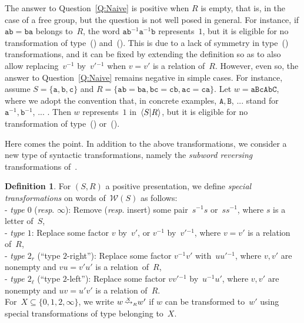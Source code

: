 \documentclass{amsart}
\numberwithin{equation}{section}
\theoremstyle{plain}
\theoremstyle{definition}
\newtheorem{defi}[prop]{Definition}
\newcounter{ITEM}
\begin{document}
The answer to Question~\ref{Q:Naive} is positive when ${R}$ is empty, that is, in the case of a free group, but the question is not well posed in general. For instance, if ${\mathtt{a}} {\mathtt{b}} = {\mathtt{b}} {\mathtt{a}}$ belongs to~${R}$, the word ${\mathtt{a}} {\mathtt{b}}{^{-1}} {\mathtt{a}}{^{-1}} {\mathtt{b}}$ represents~$1$, but it is eligible for no transformation of type~{\setcounter{ITEM}{1}\leavevmode\hbox{\rm()}} and~{\setcounter{ITEM}{2}\leavevmode\hbox{\rm()}}. This is due to a lack of symmetry in type~{\setcounter{ITEM}{2}\leavevmode\hbox{\rm()}} transformations, and it can be fixed by extending the definition so as to also allow replacing~${v}{^{-1}} $ by~${v}'{}{^{-1}} $ when ${v} = {v}'$ is a relation of~${R}$. However, even so, the answer to Question~\ref{Q:Naive} remains negative in simple cases. For instance, assume ${S} = \{{\mathtt{a}}, {\mathtt{b}}, {\mathtt{c}}\}$ and ${R} = \{{\mathtt{a}} {\mathtt{b}} = {\mathtt{b}} {\mathtt{a}}, {\mathtt{b}} {\mathtt{c}} = {\mathtt{c}} {\mathtt{b}}, {\mathtt{a}} {\mathtt{c}} = {\mathtt{c}} {\mathtt{a}}\}$. Let ${w} = {\mathtt{a}} {\mathtt{B}} {\mathtt{c}} {\mathtt{A}} {\mathtt{b}} {\mathtt{C}}$, where we adopt the convention that, in concrete examples, ${\mathtt{A}}, {\mathtt{B}}$, ... stand for~${\mathtt{a}}{^{-1}}, {\mathtt{b}}{^{-1}}$, ... \cite{Eps}. Then ${w}$ represents~$1$ in~${\langle{S}{\mid}\nobreak{R}\rangle}$, 
but it is eligible for no transformation of type~{\setcounter{ITEM}{1}\leavevmode\hbox{\rm()}} or~{\setcounter{ITEM}{2}\leavevmode\hbox{\rm()}}.

Here comes the point. In addition to the above transformations, we consider a new type of syntactic transformations, namely the \emph{subword reversing} transformations of~\cite{Dgp, Dia}.

\begin{defi}
\label{D:Special}
For $({S}, {R})$ a positive presentation, we define \emph{special transformations} on words of~${\mathcal{W}({S})}$ as follows:\\
- \emph{type $0$} ({{\it resp}}. $\infty$): Remove ({{\it resp}}. insert) some pair~${s}{^{-1}} {s}$ or~${s} {s}{^{-1}} $, where ${s}$ is a letter of~${S}$,\\
- \emph{type $1$}: Replace some factor ${v}$ by~${v}'$, or ${v}{^{-1}} $ by~${v}'{}{^{-1}} $, where ${v} = {v}'$ is a relation of~${R}$,\\
- \emph{type $2{_{r}}$} (``type $2$-right''): Replace some factor ${v}{^{-1}} {v}'$ with~${u} {u}'{}{^{-1}} $, where ${v}, {v}'$ are nonempty and ${v} {u} = {v}' {u}'$ is a relation~of~${R}$,\\
- \emph{type $2{_{\ell}}$} (``type $2$-left''): Replace some factor ${v} {v}'{}{^{-1}} $ by~${u}{^{-1}} {u}'$, where ${v}, {v}'$ are nonempty and ${u} {v} = {u}' {v}'$ is a relation of~${R}$.\\
For~$X {\subseteq} \{0,1, 2, \infty\}$, we write ${w} {\overset{{}_{{\phantom1X\phantom1}}}{\rightsquigarrow}_{\hspace{-0.4ex}{\scriptscriptstyle R}}} {w}'$ if ${w}$ can be transformed to~${w}'$ using special transformations of type belonging to~$X$.
\end{defi} 
\end{document}
